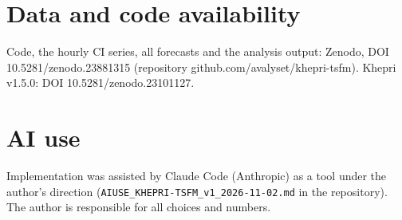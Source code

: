 \documentclass[11pt]{article}
\begin{document}
\section*{Data and code availability}
Code, the hourly CI series, all forecasts and the analysis output: Zenodo, DOI 10.5281/zenodo.23881315
(repository github.com/avalyset/khepri-tsfm). Khepri v1.5.0: DOI 10.5281/zenodo.23101127.

\section*{AI use}
Implementation was assisted by Claude Code (Anthropic) as a tool under the author's direction
(\texttt{AIUSE\_KHEPRI-TSFM\_v1\_2026-11-02.md} in the repository). The author is responsible for
all choices and numbers.

{\sloppy\small
}
\end{document}
